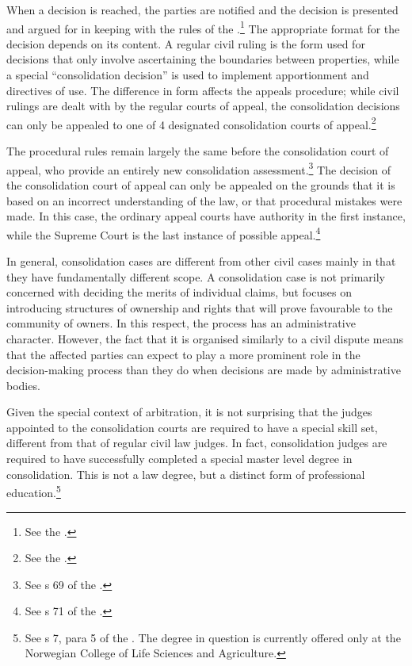 When a decision is reached, the parties are notified and the decision is presented and argued for in keeping with the rules of the \cite{cda05}.\footnote{See the 
\cite[7|22]{lca79}.} The appropriate format for the decision depends on its content. A regular civil ruling is the form used for decisions that only involve ascertaining the boundaries between properties, while a special ``consolidation decision'' is used to implement apportionment and directives of use. The difference in form affects the appeals procedure; while civil rulings are dealt with by the regular courts of appeal, the consolidation decisions can only be appealed to one of 4 designated consolidation courts of appeal.\footnote{See the \cite[61]{lca79}.}

The procedural rules remain largely the same before the consolidation court of appeal, who provide an entirely new consolidation assessment.\footnote{See s 69 of the \cite{lca79}.} The decision of the consolidation court of appeal can only be appealed on the grounds that it is based on an incorrect understanding of the law, or that procedural mistakes were made. In this case, the ordinary appeal courts have authority in the first instance, while the Supreme Court is the last instance of possible appeal.\footnote{See s 71 of the \cite{lca79}.}

In general, consolidation cases are different from other civil cases mainly in that they have fundamentally different scope. A consolidation case is not primarily concerned with deciding the merits of individual claims, but focuses on introducing structures of ownership and rights that will prove favourable to the community of owners. In this respect, the process has an administrative character. However, the fact that it is organised similarly to a civil dispute means that the affected parties can expect to play a more prominent role in the decision-making process than they do when decisions are made by administrative bodies.

Given the special context of arbitration, it is not surprising that the judges appointed to the consolidation courts are required to have a special skill set, different from that of regular civil law judges. In fact, consolidation judges are required to have successfully completed a special master level degree in consolidation. This is not a law degree, but a distinct form of professional education.\footnote{See s 7, para 5 of the \cite{lca79}. The degree in question is currently offered only at the Norwegian College of Life Sciences and Agriculture.} 

